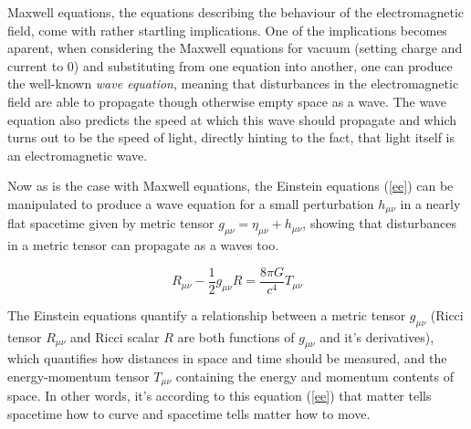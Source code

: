 Maxwell equations, the equations describing the behaviour of the electromagnetic field, come with rather startling implications. One of the implications becomes aparent, when considering the Maxwell equations for vacuum (setting charge and current to $0$) and substituting from one equation into another, one can produce the well-known {\it wave equation}, meaning that disturbances in the electromagnetic field are able to propagate though otherwise empty space as a wave. The wave equation also predicts the speed at which this wave should propagate and which turns out to be the speed of light, directly hinting to the fact, that light itself is an electromagnetic wave.

Now as is the case with Maxwell equations, the Einstein equations (\ref{ee}) can be manipulated to produce a wave equation for a small perturbation $h_{\mu\nu}$ in a nearly flat spacetime given by metric tensor $g_{\mu\nu} = \eta_{\mu\nu}+h_{\mu\nu}$, showing that disturbances in a metric tensor can propagate as a waves too. 

\begin{equation}\label{ee}
    R_{\mu\nu} - \frac{1}{2}g_{\mu\nu}R = \frac{8\pi G}{c^4} T_{\mu\nu}
\end{equation}

The Einstein equations quantify a relationship between a metric tensor $g_{\mu\nu}$ (Ricci tensor $R_{\mu\nu}$ and Ricci scalar $R$ are both functions of $g_{\mu\nu}$ and it's derivatives), which quantifies how distances in space and time should be measured, and the energy-momentum tensor $T_{\mu\nu}$ containing the energy and momentum contents of space. In other words, it's according to this equation (\ref{ee}) that matter tells spacetime how to curve and spacetime tells matter how to move.


